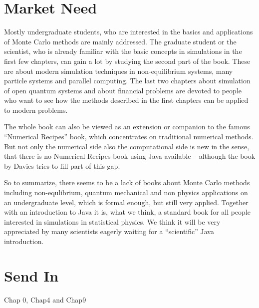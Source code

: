\documentclass[a4paper]{book}
\begin{document}
\section*{Market Need}
Mostly undergraduate students, who are interested in the basics and
applications of Monte Carlo methods are mainly addressed.
The graduate student or the scientist, who is already familiar with 
the basic concepts in simulations in the first few chapters, 
can gain a lot by studying the second part of the book.
These are about modern simulation techniques in non-equilibrium systems, 
many particle systems and parallel computing.
The last two chapters about simulation of open quantum systems and about 
financial problems are devoted to people who want to see how the methods 
described in the first chapters can be applied to modern problems.

The whole book can also be viewed as an extension or companion to the famous ``Numerical Recipes'' book, which concentrates on traditional numerical methods.
But not only the numerical side also the computational side is new in the 
sense, that there is no Numerical Recipes book using Java available -- 
although the book by Davies tries to fill part of this gap.

So to summarize, there seems to be a lack of books about Monte Carlo
methods including non-equlibrium, quantum mechanical and non
physics applications on an undergraduate level, which is formal enough,
but still very applied. Together with an introduction to Java it is, what
we think, a standard book for all people interested in simulations
in statistical physics. We think it will be very appreciated by many
scientists eagerly waiting for a ``scientific'' Java introduction.


\section*{Send In}
Chap 0, Chap4 and Chap9
\end{document}
